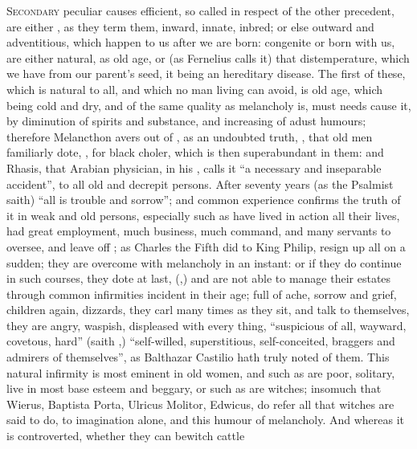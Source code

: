 \lettrine{S}{econdary} peculiar causes efficient, so called in respect of the
other precedent, are either , as they term
them, inward, innate, inbred; or else outward and adventitious, which happen to
us after we are born: congenite or born with us, are either natural, as old
age, or  (as Fernelius calls it) that
distemperature, which we have from our parent's seed, it being an hereditary
disease. The first of these, which is natural to all, and which no man living
can avoid, is old age, which being cold and dry, and of
the same quality as melancholy is, must needs cause it, by diminution of
spirits and substance, and increasing of adust humours; therefore
Melancthon avers out of \Aristotle{}, as an undoubted truth,
, that old men familiarly dote, , for black choler, which is then superabundant in them: and
Rhasis, that Arabian physician, in his , calls it \enquote{a necessary and inseparable accident}, to
all old and decrepit persons. After seventy years (as the Psalmist saith)
\enquote{all is trouble and sorrow}; and common experience
confirms the truth of it in weak and old persons, especially such as have lived
in action all their lives, had great employment, much business, much command,
and many servants to oversee, and leave off ; as
Charles the Fifth did to King Philip, resign up all on a
sudden; they are overcome with melancholy in an instant: or if they do continue
in such courses, they dote at last, (,) and are not able to
manage their estates through common infirmities incident in their age; full of
ache, sorrow and grief, children again, dizzards, they carl many times as they
sit, and talk to themselves, they are angry, waspish, displeased with every
thing, \enquote{suspicious of all, wayward, covetous, hard} (saith \Tully{},)
\enquote{self-willed, superstitious, self-conceited, braggers and admirers of
themselves}, as Balthazar Castilio hath truly noted of
them. This natural infirmity is most eminent in old women,
and such as are poor, solitary, live in most base esteem and beggary, or such
as are witches; insomuch that Wierus, Baptista Porta, Ulricus Molitor, Edwicus,
do refer all that witches are said to do, to imagination alone, and this humour
of melancholy. And whereas it is controverted, whether they can bewitch cattle
